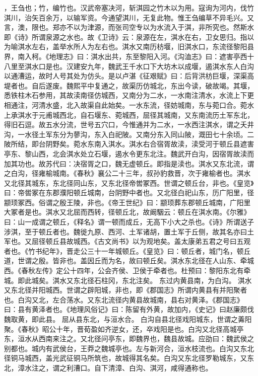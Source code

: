 \documentclass[12pt,UTF8]{ctexbook}
\begin{document}
，王刍也；竹，编竹也。汉武帝塞决河，斩淇园之竹木以为用。寇询为河内，伐竹淇川，治矢百余万，以输军资。今通望淇川，无复此物。惟王刍编草不异毛兴。又言，澳，限也。郑亦不以为津源，而张司空专以为水流入于淇，非所究也。然斯水即《诗》所谓泉源之水也。故《卫诗》云：泉源在左，淇水在右，卫女思归。指以为喻淇水左右，盖举水所人为左右也。淇水又南历枋堰，旧淇水口，东流径黎阳县界，南入柯。《地理志》曰：淇水出共，东至黎阳入河。《沟洫志》曰：遮害亭西十八里至淇水口是也。汉建安九年，魏武王千水口下大坊木以成堰，遏淇水东人白沟以通漕运，故时人号其处为仿头。是以卢湛《征艰赋》曰：后背洪枋巨堰，深渠高堤者也。自后遂废。魏熙平中复通之，故渠历仿城北，东出今读，破故竭。其堰，悉铁柱木石参用，其故渎南径仿城西，又南分为二水，一水南注清水，水流上下更相通注，河清水盛，北入故渠自此始矣。一水东流，径妨城南，东与菀口合。菀水上承淇水于元甫城西北，自石堰东、菀城西，屈径其城南，又东南流历土军东北，得旧石逗。故五水分流，世号五穴口，今惟通并为二水，一水西注淇水，谓之夭井沟，一水径土军东分为蓼沟，东入白祀陂。又南分东入同山陂，溉田七十余顷。二陂所结，即台阴野矣。菀水东南入淇水。淇水右合宿胥故渎，渎受河于顿丘县遮害亭东、黎山西，北会淇水处立石堰，遏水令更东北注。魏武开白沟，因宿胥故渎而加其功也。故苏代曰：决宿胥之口，魏无虚顿丘。即指是渎也。淇水又东北流，谓之白沟，径雍榆城南。《春秋》襄公二十三年，叔孙豹救晋，次于雍榆者也。淇水又北径其城东，东北径同山东，又东北径帝喾冢西。世谓之顿丘台，非也。《皇览》曰：帝喾冢在东郡濮阳顿丘城南，台阴野中者也。又北径白祀山东，历广阳里，径颛顼冢西。俗谓之殷王陵，非也。《帝王世纪》曰：颛顼葬东郡顿丘城南，广阳里大冢者是也。淇水又北屈而西转，径顿丘北，故阚駰云：顿丘在淇水南。《尔雅》曰：山一成谓之顿丘，《释名》谓一顿而成丘，无高下小大之杀也。《诗》所谓送子涉淇，至于顿丘者也。魏徙九原、西河、土军诸胡，置土军于丘侧，故其名亦曰土军也。又屈径顿丘县故城西。《古文尚书》以为观地矣。盖太康弟五君之号曰五观者也。《竹书纪年》，晋走公三十一年城顿丘。《皇览》曰：顿丘者，城门名，顿丘道，世谓之殷。皆非也。盖因丘而为名，故曰顿丘矣。淇水东北径在人山东、牵城西。《春秋左传》定公十四年，公会齐侯、卫侯于牵者也。杜预曰：黎阳东北有牵城。即此城矣。淇水又东北径石柱冈，东北注矣。
东过内黄县南，为白沟。
淇水又东北径并阳城西。世谓之辟阳城，非也，即《郡国志》所谓内黄县有并阳聚者也。白沟又北，左合荡水。又东北流径内黄县故城南，县右对黄泽。《郡国志》曰：县有黄泽者也。《地理风俗记》曰：陈留有外黄，故加内，《史记》曰赵廉颇伐魏取黄，即此县。
屈从县东北，与洹水合。
白沟自县北径戏阳城东，世谓之羛阳聚。《春秋》昭公十年，晋荀盈如齐逆女，还，卒戏阳是也。白沟又北径高城亭东，洹水从西南来注之。又北径问亭东，即魏界也，魏县故城。应劭曰：魏武侯之别都也。城内有武侯台，王莽之魏城亭也。左与新河合，洹水枝流也。白沟又东北径铜马城西，盖光武征铜马所筑也，故城得其名矣。白沟又东北径罗勒城东，又东北，漳水注之，谓之利漕口。自下清漳、白沟、淇河，咸得通称也。
\end{document}
